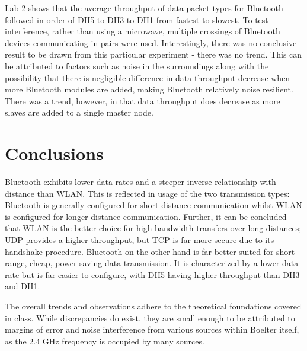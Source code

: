 \documentclass[twoside,twocolumn]{article}
\begin{document}
\hfill

\noindent Lab 2 shows that the average throughput of data packet types for Bluetooth followed in order of DH5 to DH3 to DH1 from fastest to slowest. To test interference, rather than using a microwave, multiple crossings of Bluetooth devices communicating in pairs were used. Interestingly, there was no conclusive result to be drawn from this particular experiment - there was no trend. This can be attributed to factors such as noise in the surroundings along with the possibility that there is negligible difference in data throughput decrease when more Bluetooth modules are added, making Bluetooth relatively noise resilient. There was a trend, however, in that data throughput does decrease as more slaves are added to a single master node.


\section{Conclusions}

Bluetooth exhibits lower data rates and a steeper inverse relationship with distance than WLAN. This is reflected in usage of the two transmission types: Bluetooth is generally configured for short distance communication whilst WLAN is configured for longer distance communication. Further, it can be concluded that WLAN is the better choice for high-bandwidth transfers over long distances; UDP provides a higher throughput, but TCP is far more secure due to its handshake procedure. Bluetooth on the other hand is far better suited for short range, cheap, power-saving data transmission. It is characterized by a lower data rate but is far easier to configure, with DH5 having higher throughput than DH3 and DH1.

\hfill

\noindent The overall trends and observations adhere to the theoretical foundations covered in class. While discrepancies do exist, they are small enough to be attributed to margins of error and noise interference from various sources within Boelter itself, as the 2.4 GHz frequency is occupied by many sources.

\end{document}

